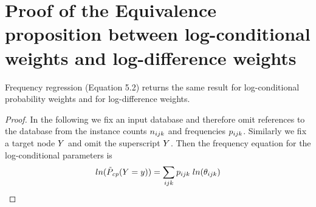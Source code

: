 \documentclass[twoside,leqno,twocolumn]{article}
\begin{document}
\section{Proof of the Equivalence proposition between log-conditional weights and log-difference weights}
\begin{proposition}
Frequency regression (Equation 5.2) returns the same result for log-conditional probability weights and for log-difference weights.
\end{proposition}

\begin{proof} In the following we fix an input database and therefore omit references to the database from the instance counts $n_{ijk}$ and frequencies $p_{ijk}$. Similarly we fix a target node $Y$ and omit the superscript $Y$. Then the frequency equation for the log-conditional parameters is
$$ln(\tilde{P}_{\it{cp}}(Y = y)) = \sum_{ijk} p_{ijk} \; ln(\theta_{ijk})$$


\end{proof}
\end{document}
